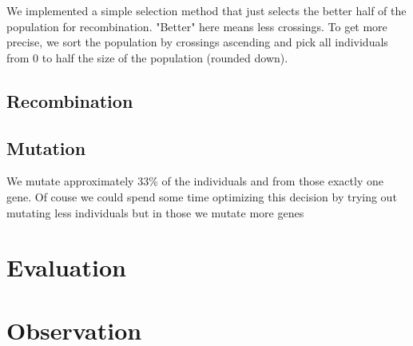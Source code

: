 \documentclass [11pt]{article}
\begin{document}
We implemented a simple selection method that just selects the better half of the population for recombination. "Better" here means less crossings. To get more precise, we sort the population by crossings ascending and pick all individuals from 0 to half the size of the population (rounded down).

\subsection{Recombination}

\subsection{Mutation}

We mutate approximately 33\% of the individuals and from those exactly one gene. Of couse we could spend some time optimizing this decision by trying out mutating less individuals but in those we mutate more genes 

\section{Evaluation}

\section{Observation}
\end{document}
